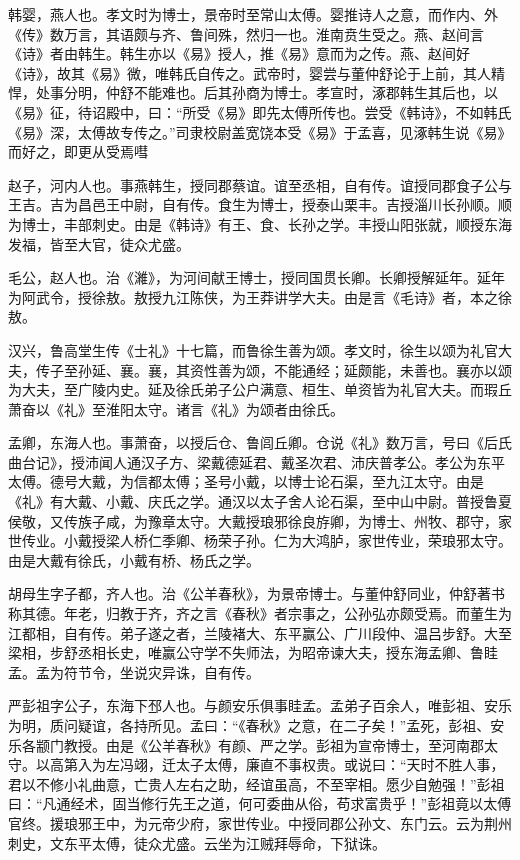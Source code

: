 \documentclass[]{article}
\begin{document}
韩婴，燕人也。孝文时为博士，景帝时至常山太傅。婴推诗人之意，而作内、外《传》数万言，其语颇与齐、鲁间殊，然归一也。淮南贲生受之。燕、赵间言《诗》者由韩生。韩生亦以《易》授人，推《易》意而为之传。燕、赵间好《诗》，故其《易》微，唯韩氏自传之。武帝时，婴尝与董仲舒论于上前，其人精悍，处事分明，仲舒不能难也。后其孙商为博士。孝宣时，涿郡韩生其后也，以《易》征，待诏殿中，曰：``所受《易》即先太傅所传也。尝受《韩诗》，不如韩氏《易》深，太傅故专传之。''司隶校尉盖宽饶本受《易》于孟喜，见涿韩生说《易》而好之，即更从受焉嘒

赵子，河内人也。事燕韩生，授同郡蔡谊。谊至丞相，自有传。谊授同郡食子公与王吉。吉为昌邑王中尉，自有传。食生为博士，授泰山栗丰。吉授淄川长孙顺。顺为博士，丰部刺史。由是《韩诗》有王、食、长孙之学。丰授山阳张就，顺授东海发福，皆至大官，徒众尤盛。

毛公，赵人也。治《濰》，为河间献王博士，授同国贯长卿。长卿授解延年。延年为阿武令，授徐敖。敖授九江陈侠，为王莽讲学大夫。由是言《毛诗》者，本之徐敖。

汉兴，鲁高堂生传《士礼》十七篇，而鲁徐生善为颂。孝文时，徐生以颂为礼官大夫，传子至孙延、襄。襄，其资性善为颂，不能通经；延颇能，未善也。襄亦以颂为大夫，至广陵内史。延及徐氏弟子公户满意、桓生、单资皆为礼官大夫。而瑕丘萧奋以《礼》至淮阳太守。诸言《礼》为颂者由徐氏。

孟卿，东海人也。事萧奋，以授后仓、鲁闾丘卿。仓说《礼》数万言，号曰《后氏曲台记》，授沛闻人通汉子方、梁戴德延君、戴圣次君、沛庆普孝公。孝公为东平太傅。德号大戴，为信都太傅；圣号小戴，以博士论石渠，至九江太守。由是《礼》有大戴、小戴、庆氏之学。通汉以太子舍人论石渠，至中山中尉。普授鲁夏侯敬，又传族子咸，为豫章太守。大戴授琅邪徐良斿卿，为博士、州牧、郡守，家世传业。小戴授梁人桥仁季卿、杨荣子孙。仁为大鸿胪，家世传业，荣琅邪太守。由是大戴有徐氏，小戴有桥、杨氏之学。

胡母生字子都，齐人也。治《公羊春秋》，为景帝博士。与董仲舒同业，仲舒著书称其德。年老，归教于齐，齐之言《春秋》者宗事之，公孙弘亦颇受焉。而董生为江都相，自有传。弟子遂之者，兰陵褚大、东平赢公、广川段仲、温吕步舒。大至梁相，步舒丞相长史，唯赢公守学不失师法，为昭帝谏大夫，授东海孟卿、鲁眭孟。孟为符节令，坐说灾异诛，自有传。

严彭祖字公子，东海下邳人也。与颜安乐俱事眭孟。孟弟子百余人，唯彭祖、安乐为明，质问疑谊，各持所见。孟曰：``《春秋》之意，在二子矣！''孟死，彭祖、安乐各颛门教授。由是《公羊春秋》有颜、严之学。彭祖为宣帝博士，至河南郡太守。以高第入为左冯翊，迁太子太傅，廉直不事权贵。或说曰：``天时不胜人事，君以不修小礼曲意，亡贵人左右之助，经谊虽高，不至宰相。愿少自勉强！''彭祖曰：``凡通经术，固当修行先王之道，何可委曲从俗，苟求富贵乎！''彭祖竟以太傅官终。援琅邪王中，为元帝少府，家世传业。中授同郡公孙文、东门云。云为荆州刺史，文东平太傅，徒众尤盛。云坐为江贼拜辱命，下狱诛。
\end{document}
